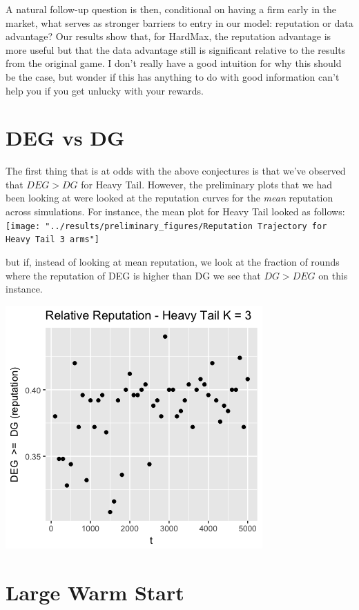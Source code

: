 \documentclass[11pt,letterpaper]{article}
\begin{document}
A natural follow-up question is then, conditional on having a firm early in the market, what serves as stronger barriers to entry in our model: reputation or data advantage? Our results show that, for HardMax, the reputation advantage is more useful but that the data advantage still is significant relative to the results from the original game. I don't really have a good intuition for why this should be the case, but wonder if this has anything to do with good information can't help you if you get unlucky with your rewards.

\section*{DEG vs DG}

The first thing that is at odds with the above conjectures is that we've observed that $DEG > DG$ for Heavy Tail. However, the preliminary plots that we had been looking at were looked at the reputation curves for the \textit{mean} reputation across simulations. For instance, the mean plot for Heavy Tail looked as follows: \\
\texttt{[image: "../results/preliminary\_figures/Reputation Trajectory for Heavy Tail 3 arms"]}

but if, instead of looking at mean reputation, we look at the fraction of rounds where the reputation of DEG is higher than DG we see that $DG > DEG$ on this instance.

\includegraphics[scale=0.5]{deg_dg_ht_3_prelim}

\section*{Large Warm Start}
\end{document}

